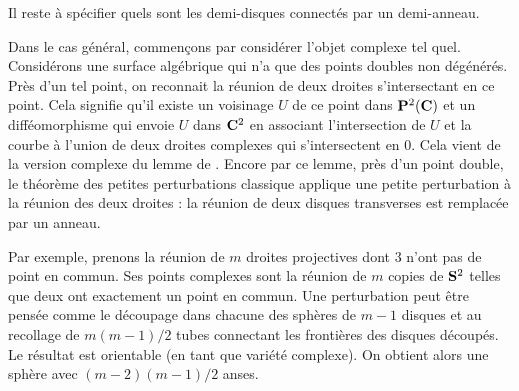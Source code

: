 \documentclass{livre}
\begin{document}
Il reste à spécifier quels sont les demi-disques connectés par un demi-anneau.


Dans le cas général, commençons par considérer l'objet complexe tel quel. Considérons une surface algébrique qui n'a que des points doubles non dégénérés. Près d'un tel point, on reconnait la réunion de deux droites s'intersectant en ce point. Cela signifie qu'il existe un voisinage $U$ de ce point dans $\mathbf{P}^{2}(\mathbf{C})$ et un difféomorphisme qui envoie $U$ dans $\mathbf{C}^{2}$ en associant l'intersection de $U$ et la courbe à l'union de deux droites complexes qui s'intersectent en $0$. Cela vient de la version complexe du lemme de . Encore par ce lemme, près d'un point double, le théorème des petites perturbations classique applique une petite perturbation à la réunion des deux droites : la réunion de deux disques transverses est remplacée par un anneau.


Par exemple, prenons la réunion de $m$ droites projectives dont $3$ n'ont pas de point en commun. Ses points complexes sont la réunion de $m$ copies de $\mathbf{S}^{2}$ telles que deux ont exactement un point en commun. Une perturbation peut être pensée comme le découpage dans chacune des sphères de $m-1$ disques et au recollage de $m(m-1)/2$ tubes connectant les frontières des disques découpés. Le résultat est orientable (en tant que variété complexe). On obtient alors une sphère avec $(m-2)(m-1)/2$ anses.




\printbibliography
\end{document}
